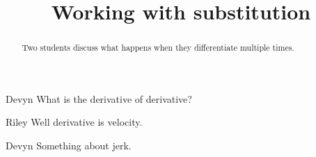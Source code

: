 \documentclass{ximera}
\title[Break-Ground:]{Working with substitution}
\begin{document}
\begin{abstract}
Two students discuss what happens when they differentiate multiple times.
\end{abstract}
\maketitle

\begin{dialogue}
  \item[Devyn] What is the derivative of derivative?
  \item[Riley] Well derivative is velocity.
  \item[Devyn] Something about jerk.
\end{dialogue}


\end{document}
